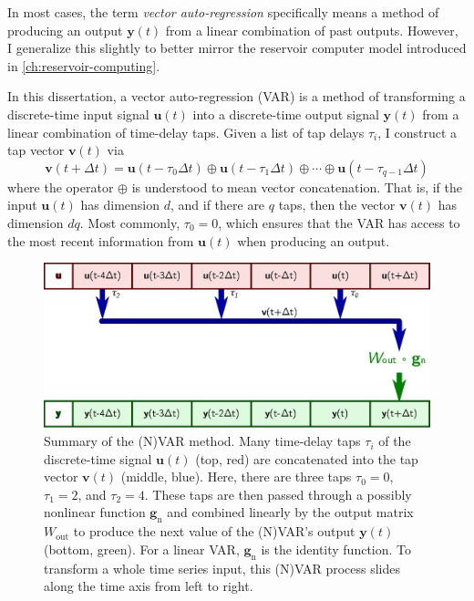 In most cases, the term \emph{vector auto-regression} specifically
means a method of producing an output $\bm{y}(t)$ from a linear
combination of past outputs. However, I generalize this slightly
to better mirror the reservoir computer model introduced in
\cref{ch:reservoir-computing}.

In this dissertation, a vector auto-regression (VAR) is a method of
transforming a discrete-time input signal $\bm{u}(t)$ into a
discrete-time output signal $\bm{y}(t)$ from a linear combination of
time-delay taps. Given a list of tap delays $\tau_i$, I construct
a tap vector $\bm{v}(t)$ via
\begin{equation}
  \label{eq:var-v}
  \bm{v}(t + \Delta t) = \bm{u}(t - \tau_0 \Delta t) \oplus \bm{u}(t - \tau_1 \Delta t) \oplus \cdots \oplus \bm{u}(t - \tau_{q-1} \Delta t)
\end{equation}
where the operator $\oplus$ is understood to mean vector
concatenation. That is, if the input $\bm{u}(t)$ has dimension $d$,
and if there are $q$ taps, then the vector $\bm{v}(t)$ has dimension
$dq$. Most commonly, $\tau_0 = 0$, which ensures that the VAR has access to the most recent information from $\bm{u}(t)$ when producing an output.

\begin{figure}
  \includegraphics{figures/var-infer}
  \caption{Summary of the (N)VAR method. Many time-delay taps $\tau_i$
    of the discrete-time signal $\bm{u}(t)$ (top, red) are concatenated into the tap
    vector $\bm{v}(t)$ (middle, blue). Here, there are three taps
    $\tau_0=0$, $\tau_1=2$, and $\tau_2=4$. These taps are then passed
    through a possibly nonlinear function $\bm{g}_\text{n}$ and
    combined linearly by the output matrix $W_\text{out}$ to produce
    the next value of the (N)VAR's output $\bm{y}(t)$ (bottom,
    green). For a linear VAR, $\bm{g}_\text{n}$ is the identity
    function. To transform a whole time series input, this (N)VAR process
    slides along the time axis from left to right.}
  \label{fig:var-infer}
\end{figure}

